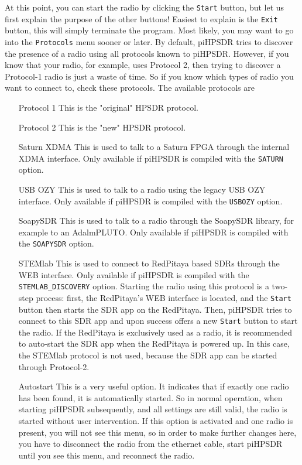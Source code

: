 \documentclass[12pt]{book}
\begin{document}
At this point, you can start the radio by clicking the \texttt{Start} button, but let us first explain the
purpose of the other buttons! Easiest to explain is the \texttt{Exit} button, this will simply terminate
the program. Most likely, you may want to go into the \texttt{Protocols} menu sooner or later.
 By default, piHPSDR tries to
discover the presence of a radio using all protocols known to piHPSDR. However, if you know that your radio, for
example, uses Protocol 2, then trying to discover a Protocol-1 radio is just a waste of time. So if you
know which types of radio you want to connect to, check these protocols. The available protocols are
\begin{itemize}[font=\texttt, left=80pt]
\item[Protocol 1]{This is the "original" HPSDR protocol.}
\item[Protocol 2]{This is the "new" HPSDR protocol.}
\item[Saturn XDMA]{This is used to talk to a Saturn FPGA through the internal XDMA interface. Only available
if piHPSDR is compiled with the \texttt{SATURN}  option.}
\item[USB OZY]{This is used to talk to a radio using the legacy USB OZY interface. Only available if piHPSDR
is compiled with the \texttt{USBOZY} option.}
\item[SoapySDR]{This is used to talk to a radio through the SoapySDR library, for example to an AdalmPLUTO. 
Only available if piHPSDR is compiled with the \texttt{SOAPYSDR} option.}
\item[STEMlab]{This is used to connect to RedPitaya based SDRs through the WEB interface. Only available if piHPSDR is
compiled with the \texttt{STEMLAB\_DISCOVERY} option. Starting the radio using this protocol is a two-step process:
first, the RedPitaya's WEB interface is located, and the \texttt{Start} button then starts the SDR app
on the RedPitaya. Then, piHPSDR tries to connect to this SDR app and upon success offers a new \texttt{Start} button
to start the radio. If the RedPitaya is exclusively used as a radio, it is recommended to auto-start the SDR app
when the RedPitaya is powered up. In this case, the STEMlab protocol is not used, because the SDR app can be started
through Protocol-2.}
\item[Autostart]{This is a very useful option. It indicates that if exactly one radio has been found, it is automatically
started. So in normal operation, when starting piHPSDR subsequently, and all settings are still valid, the radio is
started without user intervention. If this option is activated and one radio is present, you will not see this menu, so in order
to make further changes here, you have to disconnect the radio from the ethernet cable, start piHPSDR until you see this
menu, and reconnect the radio.}
\end{itemize}
\end{document}
